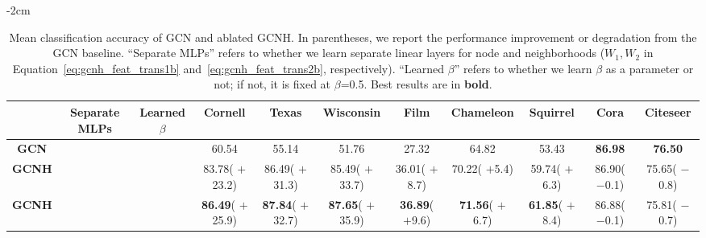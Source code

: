 \documentclass[conference]{IEEEtran}
\newcommand{\gcnhred}[1]{{\color{BrickRed} #1}}
\newcommand{\gcnhgreen}[1]{{\color{ForestGreen} #1}}
\newcommand{\cmark}{\ding{51}}\newcommand{\xmark}{\ding{55}}
\begin{document}
\begin{table*}[t]
    \footnotesize
    \centering
    \addtolength{\leftskip} {-2cm}
    \addtolength{\rightskip}{-2cm}
    \setlength{\tabcolsep}{0.44em}
\begin{tabular}{ c c c | c c c c c c c c }
    \toprule
    & Separate MLPs & Learned $\beta$  &\textbf{Cornell} & \textbf{Texas} & \textbf{Wisconsin} & \textbf{Film} & \textbf{Chameleon} & \textbf{Squirrel} & \textbf{Cora} & \textbf{Citeseer} \\
\midrule
\textbf{GCN} & \xmark & \xmark & 60.54 & 55.14 & 51.76 & 27.32 & 64.82 & 53.43 & \textbf{86.98} & \textbf{76.50} \\\midrule 
\textbf{GCNH} & \cmark & \xmark & 83.78(\gcnhgreen{$+$23.2}) & 86.49(\gcnhgreen{$+$31.3}) & 85.49(\gcnhgreen{$+$33.7}) & 36.01(\gcnhgreen{$+$8.7}) & 70.22(\gcnhgreen{$+$5.4}) & 59.74(\gcnhgreen{$+$6.3}) & 86.90(\gcnhred{$-$0.1}) & 75.65(\gcnhred{$-$0.8}) \\ 
\textbf{GCNH} & \cmark & \cmark & \textbf{86.49}(\gcnhgreen{$+$25.9}) & \textbf{87.84}(\gcnhgreen{$+$32.7}) & \textbf{87.65}(\gcnhgreen{$+$35.9}) & \textbf{36.89}(\gcnhgreen{$+$9.6}) & \textbf{71.56}(\gcnhgreen{$+$6.7}) & \textbf{61.85}(\gcnhgreen{$+$8.4}) & 86.88(\gcnhred{$-$0.1}) & 75.81(\gcnhred{$-$0.7}) \\  
    \bottomrule
    \end{tabular}
    \caption{Mean classification accuracy of GCN and ablated GCNH. In parentheses, we report the performance \gcnhgreen{improvement} or \gcnhred{degradation} from the GCN baseline. ``Separate MLPs'' refers to whether we learn separate linear layers for node and neighborhoods ($W_1, W_2$ in Equation~\ref{eq:gcnh_feat_trans1b} and~\ref{eq:gcnh_feat_trans2b}, respectively). ``Learned $\beta$'' refers to whether we learn $\beta$ as a parameter or not; if not, it is fixed at $\beta$=0.5. Best results are in \textbf{bold}.}
    \label{tab:ablation_exp}
    
\end{table*}
\end{document}
